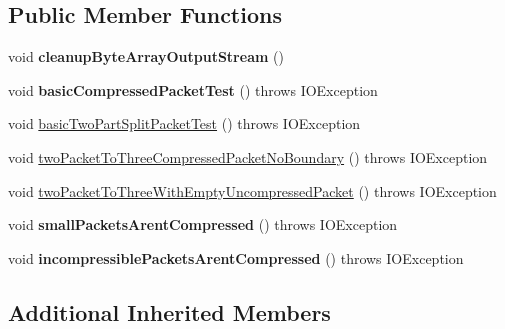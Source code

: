 \subsection*{Public Member Functions}
\begin{DoxyCompactItemize}
\item 
\mbox{\label{classcom_1_1mysql_1_1cj_1_1protocol_1_1a_1_1_compressed_packet_sender_test_af67925d0344ff8a12c1525e4cb48c6fd}} 
void {\bfseries cleanup\+Byte\+Array\+Output\+Stream} ()
\item 
\mbox{\label{classcom_1_1mysql_1_1cj_1_1protocol_1_1a_1_1_compressed_packet_sender_test_a5a69b6b2b370e80ed8f9f6b65ad48495}} 
void {\bfseries basic\+Compressed\+Packet\+Test} ()  throws I\+O\+Exception 
\item 
void \mbox{\hyperlink{classcom_1_1mysql_1_1cj_1_1protocol_1_1a_1_1_compressed_packet_sender_test_ad6a6a86c8224457f8e9c2b95d51fd82a}{basic\+Two\+Part\+Split\+Packet\+Test}} ()  throws I\+O\+Exception 
\item 
void \mbox{\hyperlink{classcom_1_1mysql_1_1cj_1_1protocol_1_1a_1_1_compressed_packet_sender_test_a594ae002b7ba9c36c05f0b069a3bbbf4}{two\+Packet\+To\+Three\+Compressed\+Packet\+No\+Boundary}} ()  throws I\+O\+Exception 
\item 
void \mbox{\hyperlink{classcom_1_1mysql_1_1cj_1_1protocol_1_1a_1_1_compressed_packet_sender_test_ac8e6517377ed11a4566c755ffc1b65de}{two\+Packet\+To\+Three\+With\+Empty\+Uncompressed\+Packet}} ()  throws I\+O\+Exception 
\item 
\mbox{\label{classcom_1_1mysql_1_1cj_1_1protocol_1_1a_1_1_compressed_packet_sender_test_ac65b76458caed5ab06d065e8ecdd9b50}} 
void {\bfseries small\+Packets\+Arent\+Compressed} ()  throws I\+O\+Exception 
\item 
\mbox{\label{classcom_1_1mysql_1_1cj_1_1protocol_1_1a_1_1_compressed_packet_sender_test_a9eddb109f99242eaf11530fecfbbe52d}} 
void {\bfseries incompressible\+Packets\+Arent\+Compressed} ()  throws I\+O\+Exception 
\end{DoxyCompactItemize}
\subsection*{Additional Inherited Members}


